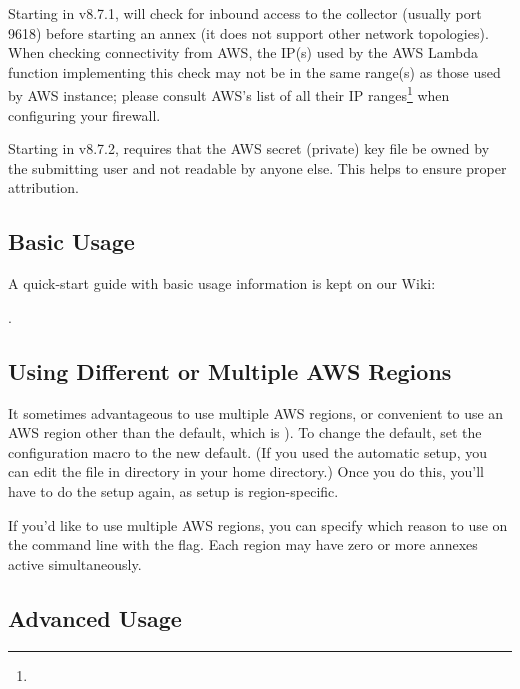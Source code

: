 Starting in v8.7.1,  will check for inbound access to the
collector (usually port 9618) before starting an annex (it does not
support other network topologies).  When checking connectivity
from AWS, the IP(s) used by the AWS Lambda function implementing this check
may not be in the same range(s) as those used by AWS instance; please
consult AWS's list of all their IP
ranges\footnote{}
when configuring your firewall.

Starting in v8.7.2,  requires that the AWS secret (private) key file
be owned by the submitting user and not readable by anyone else.  This
helps to ensure proper attribution.

\subsection{Basic Usage}

A quick-start guide with basic usage information is kept on our Wiki:


.

\subsection{Using Different or Multiple AWS Regions}

It sometimes advantageous to use multiple AWS regions, or convenient to use
an AWS region other than the default, which is ).  To change
the default, set the configuration macro 
to the new default.  (If you used the  automatic setup, you
can edit the  file in  directory in
your home directory.)  Once you do this, you'll have to do the setup again,
as setup is region-specific.

If you'd like to use multiple AWS regions, you can specify which reason to use
on the command line with the  flag.  Each region may have
zero or more annexes active simultaneously.

\subsection{Advanced Usage}

